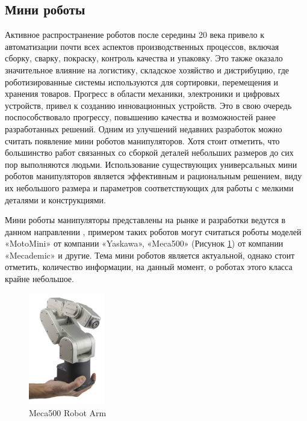 \subsection{Мини роботы}

Активное распространение роботов после середины 20 века привело к автоматизации почти всех аспектов производственных процессов, включая сборку, сварку, покраску, контроль качества и упаковку. Это также оказало значительное влияние на логистику, складское хозяйство и дистрибуцию, где роботизированные системы используются для сортировки, перемещения и хранения товаров. Прогресс в области механики, электроники и цифровых устройств, привел к созданию инновационных устройств. Это в свою очередь поспособствовало прогрессу, повышению качества и возможностей ранее разработанных решений. Одним из улучшений недавних разработок можно считать появление мини роботов манипуляторов. 
Хотя стоит отметить, что большинство работ связанных со сборкой деталей небольших размеров до сих пор выполняются людьми. Использование существующих универсальных мини роботов манипуляторов является эффективным и рациональным решением, виду их небольшого размера и параметров соответствующих для работы с мелкими деталями и конструкциями.

Мини роботы манипуляторы представлены на рынке и разработки ведутся в данном направлении \citep{Li2022}, примером таких роботов могут считаться роботы моделей «MotoMini» от компании «Yaskawa», «Meca500» (Рисунок \ref{meca}) от компании «Mecademic»  и другие. Тема мини роботов является актуальной, однако стоит отметить, количество информации, на данный момент, о роботах этого класса крайне небольшое.

\begin{figure}[H]
	\centering
	\includegraphics[width=0.3\textwidth]{Src/images/Meca500.jpg}
	\caption{Meca500 Robot Arm}
	\label{meca}
\end{figure}

